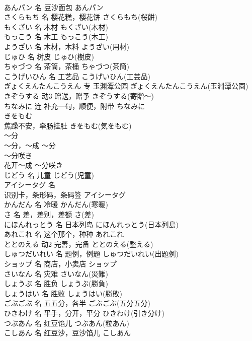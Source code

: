 \documentclass[8pt]{extreport}
\begin{document}
\begin{CJK}{UTF8}{min}
\\	あんパン	名	豆沙面包	あんパン	
\\	さくらもち	名	樱花糕，樱花饼	さくらもち(桜餅)	
\\	もくざい	名	木材	もくざい(木材)	
\\	もっこう	名	木工	もっこう(木工)	
\\	ようざい	名	木材，木料	ようざい(用材)	
\\	じゅひ	名	树皮	じゅひ(樹皮)	
\\	ちゃづつ	名	茶筒，茶桶	ちゃづつ(茶筒)	
\\	こうげいひん	名	工艺品	こうげいひん(工芸品)	
\\	ぎょくえんたんこうえん	专	玉渊潭公园	ぎょくえんたんこうえん(玉淵潭公園)	
\\	きぞうする	动3	赠送，赠予	きぞうする(寄贈～)	
\\	ちなみに	连	补充一句，顺便，附带	ちなみに	
\\	きをもむ	
\\	焦躁不安，牵肠挂肚	きをもむ(気をもむ)	
\\	～分	
\\	～分，～成	～分	
\\	～分咲き	
\\	花开～成	～分咲き	
\\	じどう	名	儿童	じどう(児童)	
\\	アイシータグ	名	
\\	识别卡，条形码，条码签	アイシータグ
\\	かんだん	名	冷暖	かんだん(寒暖)	
\\	さ	名	差，差别，差额	さ(差)	
\\	にほんれっとう	名	日本列岛	にほんれっとう(日本列島)	
\\	あれこれ	名	这个那个，种种	あれこれ	
\\	ととのえる	动2	完善，完备	ととのえる(整える)	
\\	しゅつだいれい	名	题例，例题	しゅつだいれい(出題例)	
\\	ショップ	名	商店，小卖店	ショップ	
\\	さいなん	名	灾难	さいなん(災難)	
\\	しょうぶ	名	胜负	しょうぶ(勝負)	
\\	しょうはい	名	胜败	しょうはい(勝敗)	
\\	ごぶごぶ	名	五五分，各半	ごぶごぶ(五分五分)	
\\	ひきわけ	名	平手，分开，平分	ひきわけ(引き分け)	
\\	つぶあん	名	红豆馅儿	つぶあん(粒あん)	
\\	こしあん	名	红豆沙，豆沙馅儿	こしあん	

\end{CJK}
\end{document}
